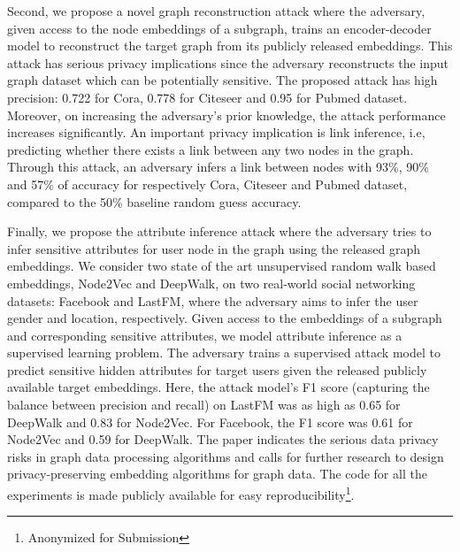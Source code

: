Second, we propose a novel graph reconstruction attack where the adversary, given access to the node embeddings of a subgraph, trains an encoder-decoder model to reconstruct the target graph from its publicly released embeddings.
This attack has serious privacy implications since the adversary reconstructs the input graph dataset which can be potentially sensitive.
The proposed attack has high precision: 0.722 for Cora, 0.778 for Citeseer and 0.95 for Pubmed dataset.
Moreover, on increasing the adversary's prior knowledge, the attack performance increases significantly.
An important privacy implication is link inference, i.e, predicting whether there exists a link between any two nodes in the graph.
Through this attack, an adversary infers a link between nodes with 93\%, 90\% and 57\% of accuracy for respectively Cora, Citeseer and Pubmed dataset, compared to the 50\% baseline random guess accuracy.


Finally, we propose the attribute inference attack where the adversary tries to infer sensitive attributes for user node in the graph using the released graph embeddings.
We consider two state of the art unsupervised random walk based embeddings, Node2Vec and DeepWalk, on two real-world social networking datasets: Facebook and LastFM, where the adversary aims to infer the user gender and location, respectively.
Given access to the embeddings of a subgraph and corresponding sensitive attributes, we model attribute inference as a supervised learning problem.
The adversary trains a supervised attack model to predict sensitive hidden attributes for target users given the released publicly available target embeddings.
Here, the attack model's F1 score (capturing the balance between precision and recall) on LastFM was as high as 0.65 for DeepWalk and 0.83 for Node2Vec.
For Facebook, the F1 score was 0.61 for Node2Vec and 0.59 for DeepWalk.
The paper indicates the serious data privacy risks in graph data processing algorithms and calls for further research to design privacy-preserving embedding algorithms for graph data.
%
The code for all the experiments is made publicly available for easy reproducibility\footnote{Anonymized for Submission}.

